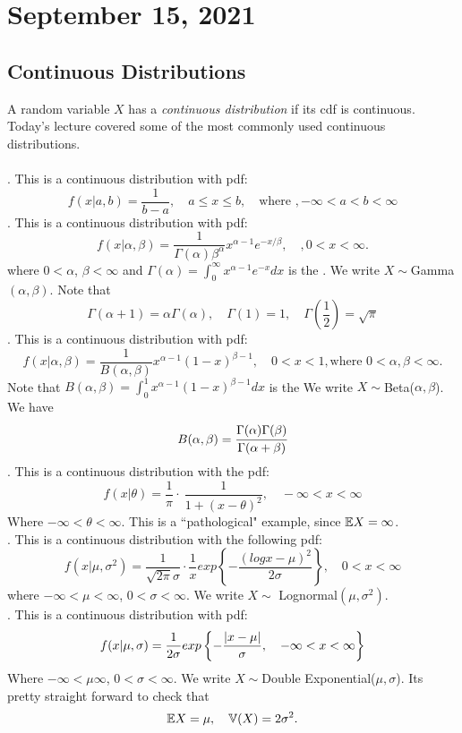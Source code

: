 \section{September 15, 2021}
\subsection{Continuous Distributions}
A random variable $X$ has a \textit{continuous distribution} if its cdf is continuous. Today's lecture covered some of the most commonly used continuous distributions. \\ \\
. This is a continuous distribution with pdf:
$$
f(x|a,b) = \frac{1}{b-a}, \quad a \leq x \leq b, \quad \text{where }, -\infty < a < b < \infty 
$$
.  This is a continuous distribution with pdf:
$$
f(x|\alpha, \beta) = \frac{1}{\Gamma(\alpha)\beta^{\alpha}}x^{\alpha -1}e^{-x/\beta}, \quad, 0< x < \infty.
$$
where $ 0 < \alpha$, $\beta < \infty$ and $\Gamma(\alpha) = \int_{0}^{\infty}x^{\alpha -1}e^{-x} dx$ is the . We write $X \sim$Gamma$(\alpha,\beta)$. Note that 
$$
\Gamma(\alpha +1) = \alpha\Gamma(\alpha),\quad \Gamma(1) =1, \quad \Gamma \left( \frac{1}{2} \right) =\sqrt{\pi}
$$
. This is a continuous distribution with pdf:
$$
f(x|\alpha, \beta) = \frac{1}{B(\alpha, \beta)}x^{\alpha -1}(1-x)^{\beta -1}, \quad 0 < x <1, \text{where } 0 < \alpha, \beta < \infty.
$$
Note that $B(\alpha, \beta) = \int_{0}^{1}x^{\alpha -1}(1-x)^{\beta -1} dx$  is the  We write $X \sim$Beta($\alpha, \beta$). We have
$$
B(\alpha, \beta) = \cfrac{\Gamma(\alpha)\Gamma(\beta)}{\Gamma(\alpha + \beta)}
$$
. This is a continuous distribution with the pdf:
$$
f(x|\theta) = \frac{1}{\pi} \cdot \ \frac{1}{1 + (x- \theta)^2}, \quad -\infty < x< \infty
$$
Where $-\infty < \theta < \infty$. This is a ``pathological" example, since $\mathbb E X = \infty$.\\
. This is a continuous distribution with the following pdf:
$$
f(x|\mu, \sigma^2) = \frac{1}{\sqrt{2\pi} \sigma} \cdot \frac{1}{x}
exp \left \{
-\frac{(logx - \mu)^2}{2\sigma}\right \}, \quad 0 < x < \infty
$$
where $-\infty < \mu < \infty$, $0 < \sigma < \infty$. We write $X \sim$ Lognormal$(\mu, \sigma^2)$.
\\
. This is a continuous distribution with pdf:
$$
f(x|\mu,\sigma) = \frac{1}{2\sigma}exp \left \{
-\frac{\left\lvert x-\mu \right\rvert}{\sigma}, \quad -\infty<x<\infty
\right \}
$$
Where $-\infty< \mu \infty$, $0 < \sigma < \infty$. We write $X \sim $Double Exponential($\mu,\sigma$). Its pretty straight forward to check that
$$
\mathbb E X = \mu, \quad \mathbb V(X) = 2 \sigma^2.
$$
